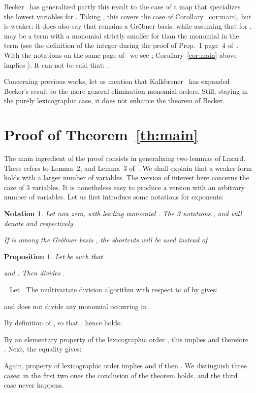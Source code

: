\documentclass[a4paper,11pt]{article}
\newcommand{\proof}{\noindent {\sc Proof:}~}
\newtheorem{Prop}{Proposition}
\newtheorem{Not}{Notation}
\begin{document}
Becker~\cite{Be94} has generalized partly this result to the case
of a map  that specializes the  lowest variables
for . Taking , this covers the case of Corollary~\ref{cor:main},
but is weaker: it does also say that  remains a Gr\"obner basis,
while assuming that for ,
 may be a term with a monomial
strictly smaller for  than the monomial in the term  (see the definition
of the integer  during the proof of Prop.~1  page~4
of~\cite{Be94}.
With the notations on the same page of~\cite{Be94} we see ;
Corollary~\ref{cor:main} above implies ).
It can not be said that: . 

Concerning  previous works, let us mention that Kalkbrener~\cite{Ka97}
has expanded Becker's result to the more general elimination monomial
orders. Still, staying in the purely lexicographic case,
it does not enhance  the theorem of Becker.

\section{Proof of Theorem~\ref{th:main}}
The main ingredient of the proof consists in generalizing two lemmas of Lazard.
These refers to Lemma~2, and Lemma~3 of~\cite{Laz85}.
We shall explain that a weaker form holds with a larger
number of variables.
The version of interest here concerns the case of 3 variables.
It is nonetheless easy to produce a version with an arbitrary number
of variables.
Let us first introduce some notations
for exponents:
\begin{Not}
Let  non zero, with leading monomial
. The 3 notations ,
 and  will denote
 and  respectively.

If  is among the Gr\"obner basis ,
the shortcuts 
will be used instead of 
\end{Not}

\begin{Prop}\label{prop:1}
Let  be such that

and .
Then  divides .
\end{Prop}
\proof
Let .
The multivariate division algorithm with respect
to  of  by  gives:

and  does not
divide any monomial occurring in .

By definition of , 
so that , hence 
holds:

By an elementary property of the lexicographic order ,
this implies  and therefore
.
Next, the equality  gives:

Again, property of lexicographic order
implies 
and if 
then .
We distinguish three cases;
in the first two ones the conclusion
of the theorem holds, and the third case
never happens.
\smallskip
\end{document}
